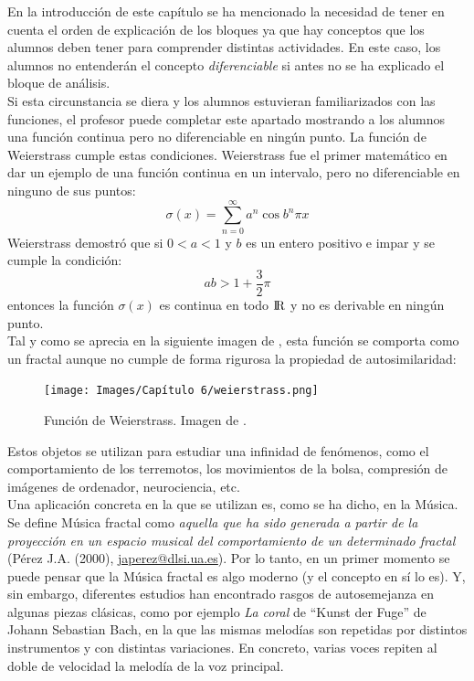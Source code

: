 \documentclass[a4paper, openright, 11pt, titlepage]{report}
\theoremstyle{definition}\newtheorem{defin}[propo]{Definition}
\theoremstyle{definition}\newtheorem{obser}[propo]{Remark}
\theoremstyle{definition}\newtheorem{ejem}[propo]{Ejemplo}
\theoremstyle{definition}\newtheorem{algoritmo}[propo]{Algoritmo}
\begin{document}
\begin{itemize}
\begin{enumerate}
        En la introducción de este capítulo se ha mencionado la necesidad de tener en cuenta el orden de explicación de los bloques ya que hay conceptos que los alumnos deben tener para comprender distintas actividades. En este caso, los alumnos no entenderán el concepto \textit{diferenciable} si antes no se ha explicado el bloque de análisis.\\
        Si esta circunstancia se diera y los alumnos estuvieran familiarizados con las funciones, el profesor puede completar este apartado mostrando a los alumnos una función continua pero no diferenciable en ningún punto. La función de Weierstrass cumple estas condiciones. Weierstrass fue el primer matemático en dar un ejemplo de una función continua en un intervalo, pero no diferenciable en ninguno de sus puntos:
        $$\sigma(x) = \sum_{n=0}^{\infty}a^{n}\cos{b^{n}\pi x}$$
        Weierstrass demostró que si $0<a<1$ y $b$ es un entero positivo e impar y se cumple la condición:
        $$ab>1+\frac{3}{2}\pi$$
        entonces la función $\sigma(x)$ es continua en todo ${\rm I\!R}$ y no es derivable en ningún punto.\\
        Tal y como se aprecia en la siguiente imagen de \cite{weier}, esta función se comporta como un fractal aunque no cumple de forma rigurosa la propiedad de autosimilaridad:
        \begin{figure}[H]
            \centering
            \texttt{[image: Images/Capítulo 6/weierstrass.png]}
            \caption{Función de Weierstrass. Imagen de \cite{weier}.}
            \label{fig:my_label}
        \end{figure}
    \end{enumerate}
    Estos objetos se utilizan para estudiar una infinidad de fenómenos, como el comportamiento de los terremotos, los movimientos de la bolsa, compresión de imágenes de ordenador, neurociencia, etc.\\
    Una aplicación concreta en la que se utilizan es, como se ha dicho, en la Música. \\
    Se define Música fractal como \textit{aquella que ha sido generada a partir de la proyección en un espacio musical del comportamiento de un determinado fractal} \cite{fractales} ({Pérez J.A.} (2000), \url{japerez@dlsi.ua.es}). Por lo tanto, en un primer momento se puede pensar que la Música fractal es algo moderno (y el concepto en sí lo es). Y, sin embargo, diferentes estudios han encontrado rasgos de autosemejanza en algunas piezas clásicas, como por ejemplo \textit{La coral} de ``Kunst der Fuge'' de Johann Sebastian Bach, en la que las mismas melodías son repetidas por distintos instrumentos y con distintas variaciones. En concreto, varias voces repiten al doble de velocidad la melodía de la voz principal.\\

\end{itemize}
\end{document}
